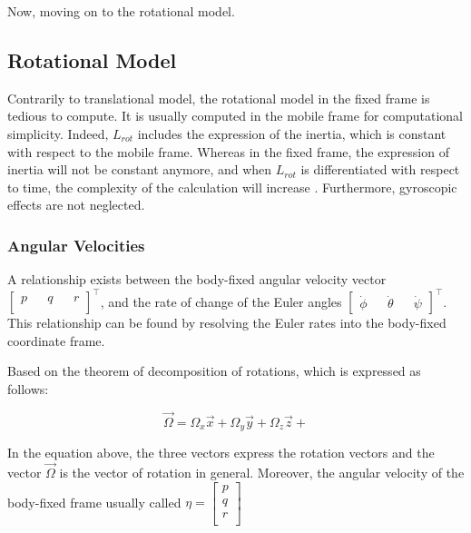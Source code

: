 \documentclass{thesisreport}
\begin{document}
Now, moving on to the rotational model.

\subsection*{Rotational Model}

Contrarily to translational model, the rotational model in the fixed frame is tedious to compute. It is usually computed in the mobile frame for computational simplicity. Indeed, $L_{rot} $ includes the expression of the inertia, which is constant with respect to the mobile frame. Whereas in the fixed frame, the expression of inertia will not be constant anymore, and when $L_{rot}$ is differentiated with respect to time, the complexity of the calculation will increase \cite{Etkin1996}. Furthermore, gyroscopic effects are not neglected.

\subsubsection*{Angular Velocities}

A relationship exists between the body-fixed angular velocity vector $\begin{bmatrix}
p && q && r \\
\end{bmatrix}^{\intercal}$, and the rate of change of the Euler angles $\begin{bmatrix}
\dot{\phi} && \dot{\theta} && \dot{\psi}
\end{bmatrix}^{\intercal}$. This relationship can be found by resolving the Euler rates into the body-fixed coordinate frame.

Based on the theorem of decomposition of rotations, which is expressed as follows:

\begin{equation*}
\overrightarrow{\Omega} = \Omega_x \overrightarrow{x} + \Omega_y \overrightarrow{y} + \Omega_z \overrightarrow{z} + 
\end{equation*}

In the equation above, the three vectors express the rotation vectors and the vector $\overrightarrow{\Omega}$ is the vector of rotation in general. Moreover, the angular velocity of the body-fixed frame usually called $\eta = \begin{bmatrix}
p \\  
q \\
r \\
\end{bmatrix}$
\end{document}
